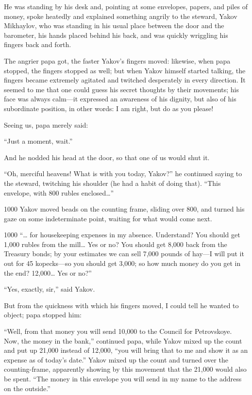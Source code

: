 He was standing by his desk and, pointing at some envelopes, papers, and piles of money, spoke heatedly and explained something angrily to the steward, Yakov Mikhaylov, who was standing in his usual place between the door and the barometer, his hands placed behind his back, and was quickly wriggling his fingers back and forth.

The angrier papa got, the faster Yakov's fingers moved: likewise, when papa stopped, the fingers stopped as well; but when Yakov himself started talking, the fingers became extremely agitated and twitched desperately in every direction. It seemed to me that one could guess his secret thoughts by their movements; his face was always calm---it expressed an awareness of his dignity, but also of his subordinate position, in other words: I am right, but do as you please!

Seeing us, papa merely said:

``Just a moment, wait.'' %

And he nodded his head at the door, so that one of us would shut it.

``Oh, merciful heavens! What is with you today, Yakov?'' he continued saying to the steward, twitching his shoulder (he had a habit of doing that). ``This envelope, with 800 rubles enclosed\ldots{}'' %

\begin{tolerant}{1000}
Yakov moved beads on the counting frame, sliding over 800, and turned his gaze on some indeterminate point, waiting for what would come next.
\end{tolerant}

\begin{tolerant}{1000}
``\ldots{} for housekeeping expenses in my absence. Understand? You should get 1,000 rubles from the mill\ldots{} Yes or no? You should get 8,000 back from the Treasury bonds; by your estimates we can sell 7,000 pounds of hay---I will put it out for 45 kopecks---so you should get 3,000; so how much money do you get in the end? 12,000\ldots{} Yes or no?'' %
\end{tolerant}

``Yes, exactly, sir,'' said Yakov. %

But from the quickness with which his fingers moved, I could tell he wanted to object; papa stopped him:

``Well, from that money you will send 10,000 to the Council for Petrovskoye. Now, the money in the bank,'' continued papa, while Yakov mixed up the count and put up 21,000 instead of 12,000, ``you will bring that to me and show it as an expense as of today's date.'' Yakov mixed up the count and turned over the counting-frame, apparently showing by this movement that the 21,000 would also be spent. ``The money in this envelope you will send in my name to the address on the outside.'' %

